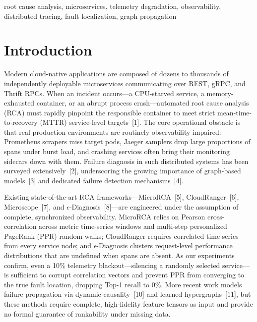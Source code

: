 \documentclass[conference]{IEEEtran}
\begin{document}
\begin{IEEEkeywords}
root cause analysis, microservices, telemetry degradation, observability, distributed tracing, fault localization, graph propagation
\end{IEEEkeywords}

\section{Introduction}

Modern cloud-native applications are composed of dozens to thousands of independently deployable microservices communicating over REST, gRPC, and Thrift RPCs. When an incident occurs---a CPU-starved service, a memory-exhausted container, or an abrupt process crash---automated root cause analysis (RCA) must rapidly pinpoint the responsible container to meet strict mean-time-to-recovery (MTTR) service-level targets~[1]. The core operational obstacle is that real production environments are routinely observability-impaired: Prometheus scrapers miss target pods, Jaeger samplers drop large proportions of spans under burst load, and crashing services often bring their monitoring sidecars down with them. Failure diagnosis in such distributed systems has been surveyed extensively~[2], underscoring the growing importance of graph-based models~[3] and dedicated failure detection mechanisms~[4].

Existing state-of-the-art RCA frameworks---MicroRCA~[5], CloudRanger~[6], Microscope~[7], and $\epsilon$-Diagnosis~[8]---are engineered under the assumption of complete, synchronized observability. MicroRCA relies on Pearson cross-correlation across metric time-series windows and multi-step personalized PageRank (PPR) random walks; CloudRanger requires correlated time-series from every service node; and $\epsilon$-Diagnosis clusters request-level performance distributions that are undefined when spans are absent. As our experiments confirm, even a 10\% telemetry blackout---silencing a randomly selected service---is sufficient to corrupt correlation vectors and prevent PPR from converging to the true fault location, dropping Top-1 recall to 0\%. More recent work models failure propagation via dynamic causality~[10] and learned hypergraphs~[11], but these methods require complete, high-fidelity feature tensors as input and provide no formal guarantee of rankability under missing data.
\end{document}
